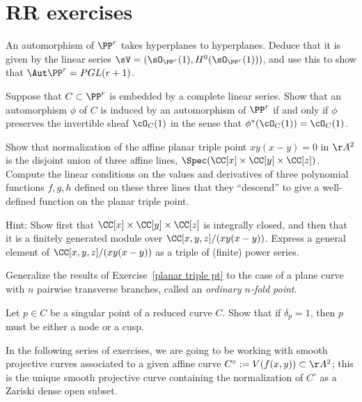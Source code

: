 
 
\chapter{RR exercises}\label{RR exercises}

\begin{exercise}
An automorphism of $\PP^r$ takes hyperplanes to hyperplanes. Deduce that it is given by the linear series
$\sV = (\sO_{\PP^r}(1), H^0(\sO_{\PP^r}(1)))$, and use this to show that $\Aut \PP^r = PGL(r+1)$. 
\end{exercise}

\begin{exercise}\label{projective automorphism}
Suppose that $C\subset \PP^r$ is embedded by a complete linear series. Show that an automorphism $\phi$ of $C$ is induced by an automorphism of $\PP^r$ if and only if $\phi$ preserves the invertible sheaf $\cO_{C}(1)$  in the sense that $\phi^*(\cO_{C}(1)) = \cO_{C}(1)$.
\end{exercise}

\begin{exercise}\label{planar triple pt}
Show that normalization of the affine planar triple point $xy(x-y) = 0$ in $\AA^2$ is the disjoint union of three
affine lines, $\Spec(\CC[x] \times \CC[y]\times \CC[z])$. Compute the linear conditions on the values and derivatives of three polynomial functions $f,g,h$ defined on
these three lines that they ``descend'' to give a well-defined function on the planar triple point.

Hint: Show first that $\CC[x] \times \CC[y]\times \CC[z]$ is integrally closed, and then that it is a finitely generated module over $\CC[x,y,z]/(xy(x-y))$.
Express a general element of $\CC[x,y,z]/(xy(x-y))$ as a triple of (finite) power series.
\end{exercise}

\begin{exercise} Generalize the results of Exercise~\ref{planar triple pt} to the case of a plane curve with $n$ pairwise
transverse branches, called an \emph{ordinary $n$-fold point}.
\end{exercise}

\begin{exercise}
Let $p \in C$ be a singular point of a reduced curve $C$. Show that if $\delta_p = 1$, then $p$ must be either a node or a cusp.
\end{exercise}

In the following series of exercises, we are going to be working with smooth projective curves associated to a given affine curve $C^\circ := V(f(x,y)) \subset \AA^2$; this is the unique smooth projective curve containing the normalization of $C^\circ$ as a Zariski dense open subset.

